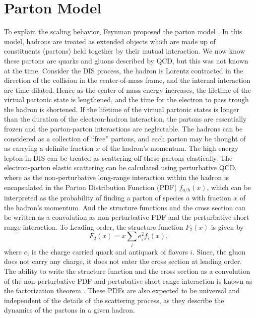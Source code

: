\documentclass[../main.tex]{subfiles}
\begin{document}
\section{Parton Model}
\label{sec:parton}
To explain the scaling behavior, Feynman proposed the parton model \cite{feynman1969}.
In this model, hadrons are treated as extended objects which are made up of
constituents (partons) held together by their mutual interaction. We now know
these partons are quarks and gluons described by QCD, but this was not known at
the time. Consider the DIS process, the hadron is Lorentz contracted in the
direction of the collision in the center-of-mass frame, and the internal
interaction are time dilated. Hence as the center-of-mass energy increases, the
lifetime of the virtual partonic state is lengthened, and the time for the
electron to pass trough the hadron is shortened. If the lifetime of the virtual
partonic states is longer than the duration of the electron-hadron interaction,
the partons are essentially frozen and the parton-parton interactions are
neglectable. The hadrons can be considered as a collection of ``free'' partons,
and each parton may be thought of as carrying a definite fraction $x$ of the
hadron's momentum. The high energy lepton in DIS can be treated as scattering
off these partons elastically. The electron-parton elastic scattering can be
calculated using perturbative QCD, where as the non-perturbative long-range
interaction within the hadron is encapsulated in the Parton Distribution
Function (PDF) $f_{a/h}\left(x\right)$, which can be interpreted as the probability
of finding a parton of species $a$ with fraction $x$ of the hadron's momentum.
And the structure functions and the cross section can be written as a convolution
as non-perturbative PDF and the perturbative short range interaction. To Leading
order, the structure function $F_2\left(x\right)$ is given by
\begin{equation}
	F_2\left(x\right)=x\sum_i e^2_i f_i\left(x\right),
	\label{eq:F2_parton}
\end{equation}
where $e_i$ is the charge carried quark and antiquark of flavors $i$. Since, the
gluon does not carry any charge, it does not enter the cross section at leading
order. The ability to write the structure function and the cross section as a
convolution of the non-perturbative PDF and pertubative short range interaction
is known as the factorization theorem \cite{collins1989}. These PDFs are also
expected to be universal and independent of the details of the scattering
process, as they describe the dynamics of the partons in a given hadron.
\end{document}
